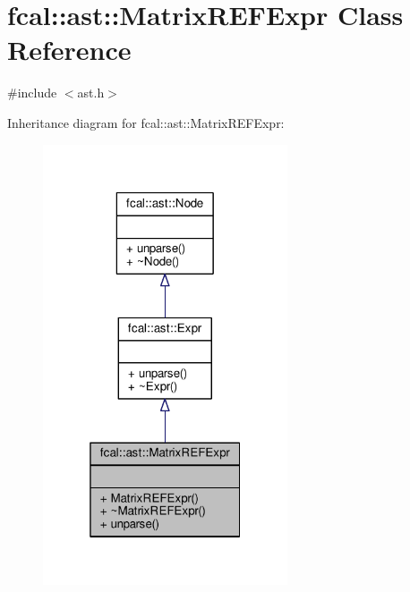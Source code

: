\hypertarget{classfcal_1_1ast_1_1MatrixREFExpr}{}\section{fcal\+:\+:ast\+:\+:Matrix\+R\+E\+F\+Expr Class Reference}
\label{classfcal_1_1ast_1_1MatrixREFExpr}


{\ttfamily \#include $<$ast.\+h$>$}



Inheritance diagram for fcal\+:\+:ast\+:\+:Matrix\+R\+E\+F\+Expr\+:
\nopagebreak
\begin{figure}[H]
\begin{center}
\leavevmode
\includegraphics[width=205pt]{classfcal_1_1ast_1_1MatrixREFExpr__inherit__graph}
\end{center}
\end{figure}


